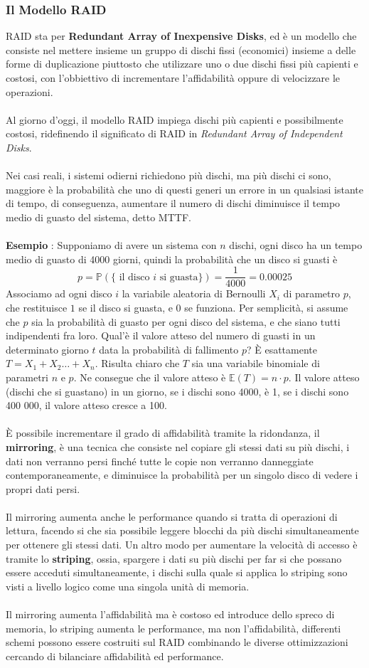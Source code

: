 \documentclass[12pt, letterpaper]{article}
\newcommand{\acc}{\\\hphantom{}\\}
\begin{document}
\subsubsection{Il Modello RAID}
RAID sta per \textbf{Redundant Array of Inexpensive Disks}, ed è un modello che consiste nel mettere insieme un gruppo 
di dischi fissi (economici) insieme a delle forme di duplicazione piuttosto che utilizzare uno o due dischi fissi 
più capienti e costosi, con l'obbiettivo di incrementare l'affidabilità oppure di velocizzare le operazioni.
\acc 
Al giorno d'oggi, il modello RAID impiega dischi più capienti e possibilmente costosi, ridefinendo il significato 
di RAID in \textit{Redundant Array of Independent Disks}.\acc 
Nei casi reali, i sistemi odierni richiedono più dischi, ma più dischi ci sono, maggiore è la probabilità che 
uno di questi generi un errore in un qualsiasi istante di tempo, di conseguenza, aumentare il numero di dischi 
diminuisce il tempo medio di guasto del sistema, detto MTTF.\acc 
\textbf{Esempio }: Supponiamo di avere un sistema con \(n\) dischi, ogni disco ha un tempo medio di guasto 
di 4000 giorni, quindi la probabilità che un disco si guasti è 
$$p=\mathbb{P}(\{\text{ il disco }i\text{ si guasta}\})=\dfrac{1}{4000}=0.00025$$
Associamo ad ogni disco \(i\) la variabile aleatoria di Bernoulli \(X_i\) di parametro \(p\), che restituisce \(1\) 
se il disco si guasta, e \(0\) se funziona. Per semplicità, si assume che \(p\) sia la probabilità di guasto per ogni 
disco del sistema, e che siano tutti indipendenti fra loro. Qual'è il valore atteso del numero di guasti in un determinato 
giorno \(t\) data la probabilità di fallimento \(p\)? È esattamente \(T=X_1+X_2\dots+X_n\). Risulta chiaro che \(T\) sia 
una variabile binomiale di parametri \(n\) e \(p\). Ne consegue che il valore atteso è \(\mathbb{E}(T)=n\cdot p\).
Il valore atteso (dischi che si guastano) in un giorno, se i dischi sono 4000, è 1, se i dischi sono 400 000, 
il valore atteso cresce a 100.
\acc 
È possibile incrementare il grado di affidabilità tramite la ridondanza, il \textbf{mirroring}, è una tecnica che consiste 
nel copiare gli stessi dati su più dischi, i dati non verranno persi finché tutte le copie non verranno danneggiate 
contemporaneamente, e diminuisce la probabilità per un singolo disco di vedere i propri dati persi.\acc 
Il mirroring aumenta anche le performance quando si tratta di operazioni di lettura, facendo si che sia possibile leggere 
blocchi da più dischi simultaneamente per ottenere gli stessi dati. Un altro modo per aumentare la velocità di accesso 
è tramite lo \textbf{striping}, ossia, spargere i dati su più dischi per far si che possano essere acceduti simultaneamente, i 
dischi sulla quale si applica lo striping sono visti a livello logico come una singola unità di memoria.\acc 
Il mirroring aumenta l'affidabilità ma è costoso ed introduce dello spreco di memoria, lo striping aumenta le performance, 
ma non l'affidabilità, differenti schemi possono essere costruiti sul RAID combinando le diverse ottimizzazioni 
cercando di bilanciare affidabilità ed performance.
\end{document}
